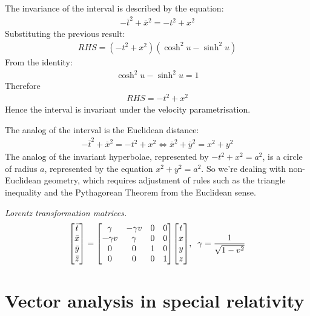 \documentclass{report}
\begin{document}
\begin{subquests}
\begin{subquests}
		\item 
		The invariance of the interval is described by the equation:
		\begin{gather*}
			-\bar{t}^{2}+\bar{x}^2=-t^2+x^2
		\end{gather*}
		Substituting the previous result:
		\begin{gather*}
			RHS = (-t^2+x^2)(\cosh^2 u - \sinh^2 u)
		\end{gather*}
		From the identity:  
		\begin{gather*}
			\cosh^2 u - \sinh^2⁡ u = 1
		\end{gather*}
		Therefore
		\begin{gather*}
			RHS=-t^2+x^2
		\end{gather*}
		Hence the interval is invariant under the velocity parametrisation.

		\item
		The analog of the interval is the Euclidean distance:
		\begin{gather*}
		-\bar{t}^2+\bar{x}^2=-t^2+x^2 \Leftrightarrow \bar{x}^2+\bar{y}^2 = x^2 + y^2
		\end{gather*}
		The analog of the invariant hyperbolae, represented by $-t^2+x^2 = a^2$, is a circle of radius $a$, represented by the equation $x^2+y^2 = a^2$.
		So we're dealing with non-Euclidean geometry, which requires adjustment of rules such as the triangle inequality and the Pythagorean Theorem from the Euclidean sense.
	\end{subquests}

	\item \emph{Lorentz transformation matrices.}
	\begin{gather*}
		\mqty[
	 		\bar{t} \\
			\bar{x} \\
			\bar{y} \\
			\bar{z}
		]
		=
		\mqty[
		 		\gamma & -\gamma v & 0 & 0 \\
			 	-\gamma v & \gamma & 0 & 0 \\
				0 & 0 & 1 & 0 \\
			 	0 & 0 & 0 & 1
		]
	 	\mqty[
	 		 t \\
	 		 x \\
	 		 y \\
	 		 z
	 	]
	 		,\;\; \gamma = \frac{1}{\sqrt{1-v^2}}
	\end{gather*}
\end{subquests}

\chapter{Vector analysis in special relativity}
\end{document}
